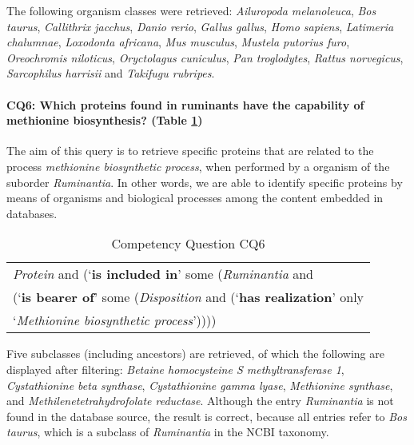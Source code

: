 The following organism classes were retrieved: \textit{Ailuropoda melanoleuca}, \textit{Bos taurus}, \textit{Callithrix jacchus}, \textit{Danio rerio}, \textit{Gallus gallus}, \textit{Homo sapiens}, \textit{Latimeria chalumnae}, \textit{Loxodonta africana}, \textit{Mus musculus}, \textit{Mustela putorius furo}, \textit{Oreochromis niloticus}, \textit{Oryctolagus cuniculus}, \textit{Pan troglodytes}, \textit{Rattus norvegicus}, \textit{Sarcophilus harrisii} and \textit{Takifugu rubripes}.

\paragraph{CQ6: Which proteins found in ruminants have the capability of methionine biosynthesis? (Table \ref{table:CQ6})} 
The aim of this query is to retrieve specific proteins that are related to the process \textit{methionine biosynthetic process}, when performed by a organism of the suborder \textit{Ruminantia}. In other words, we are able to identify specific proteins by means of organisms and biological processes among the content embedded in databases.
\begin{table} [H]
		\label{table:CQ6}
		\caption{Competency Question CQ6}
		\centering
\begin{tabular}{p{3in}}
	\hline 
		\textit{Protein} and (`\textbf{is included in}' some (\textit{Ruminantia} and \\
		\hspace{0,5cm}(`\textbf{is bearer of}' some (\textit{Disposition} and (`\textbf{has realization}' only \\
		\hspace{1cm} `\textit{Methionine biosynthetic process}')))) \\ 
	\hline 
\end{tabular} 

\end{table}
Five subclasses (including ancestors) are retrieved, of which the following are displayed after filtering:  \textit{Betaine  homocysteine S methyltransferase 1}, \textit{Cystathionine beta synthase}, \textit{Cystathionine gamma lyase}, \textit{Methionine synthase}, and \textit{Methilenetetrahydrofolate reductase}. Although the entry \textit{Ruminantia} is not found in the database source, the result is correct, because all entries refer to \textit{Bos taurus}, which is a subclass of \textit{Ruminantia} in the NCBI taxonomy.

%

